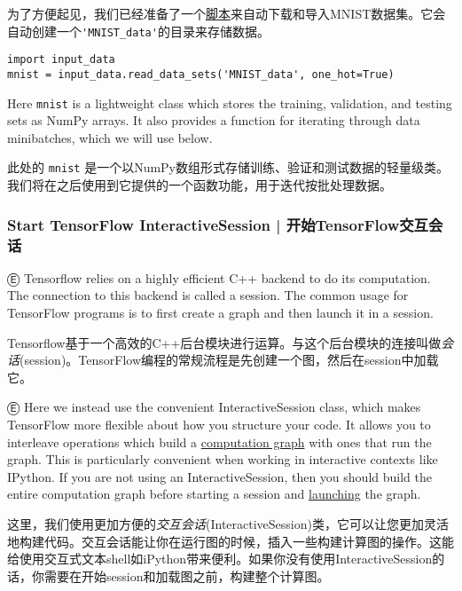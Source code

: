 为了方便起见，我们已经准备了一个\href{https://tensorflow.googlesource.com/tensorflow/+/master/tensorflow/examples/tutorials/mnist/input_data.py}{脚本}来自动下载和导入MNIST数据集。它会自动创建一个\lstinline{'MNIST_data'}的目录来存储数据。

\begin{lstlisting}
import input_data
mnist = input_data.read_data_sets('MNIST_data', one_hot=True)
\end{lstlisting}

\textcolor{etc}{Here \lstinline{mnist} is a lightweight class which stores the training, validation, and testing sets as NumPy arrays. It also provides a function for iterating through data minibatches, which we will use below.}

此处的 \lstinline{mnist} 是一个以NumPy数组形式存储训练、验证和测试数据的轻量级类。我们将在之后使用到它提供的一个函数功能，用于迭代按批处理数据。

\subsubsection {Start TensorFlow InteractiveSession  |  开始TensorFlow交互会话}

Ⓔ \textcolor{etc}{Tensorflow relies on a highly efficient C++ backend to do its computation. The connection to this backend is called a session. The common usage for TensorFlow programs is to first create a graph and then launch it in a session.}

Tensorflow基于一个高效的C++后台模块进行运算。与这个后台模块的连接叫做\emph{会话}(session)。TensorFlow编程的常规流程是先创建一个图，然后在session中加载它。

Ⓔ \textcolor{etc}{Here we instead use the convenient InteractiveSession class, which makes TensorFlow more flexible about how you structure your code. It allows you to interleave operations which build a \hyperref[computation_graph]{computation graph} with ones that run the graph. This is particularly convenient when working in interactive contexts like IPython. If you are not using an InteractiveSession, then you should build the entire computation graph before starting a session and \hyperref[launching_graph]{launching} the graph.}

这里，我们使用更加方便的\emph{交互会话}(InteractiveSession)类，它可以让您更加灵活地构建代码。交互会话能让你在运行图的时候，插入一些构建计算图的操作。这能给使用交互式文本shell如iPython带来便利。如果你没有使用InteractiveSession的话，你需要在开始session和加载图之前，构建整个计算图。

